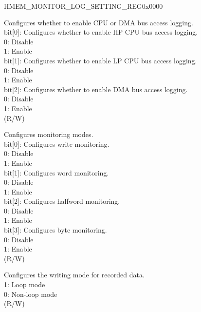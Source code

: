 \begin{register}{H}{MEM\_MONITOR\_LOG\_SETTING\_REG}{0x0000}\label{regdesc:MEMMONITORLOGSETTINGREG}
%
%
%
%
\regnewline%
\begin{regdesc}\begin{reglist}
\label{fielddesc:MEMMONITORLOGENA}\item [MEM\_MONITOR\_LOG\_ENA] Configures whether to enable  CPU or DMA bus access logging.\\
bit[0]: Configures whether to enable HP CPU bus access logging. \\
0: Disable \\
1: Enable\\
bit[1]: Configures whether to enable LP CPU bus access logging. \\
0: Disable\\
1: Enable\\
bit[2]: Configures whether to enable DMA bus access logging. \\
0: Disable\\
1: Enable\\
(R/W)
\label{fielddesc:MEMMONITORLOGMODE}\item [MEM\_MONITOR\_LOG\_MODE]  Configures monitoring modes.\\
bit[0]: Configures write monitoring. \\
0: Disable \\
1: Enable\\
bit[1]: Configures word monitoring. \\
0: Disable \\
1: Enable\\
bit[2]: Configures halfword monitoring. \\
0: Disable \\
1: Enable\\
bit[3]: Configures byte monitoring. \\
0: Disable \\
1: Enable\\
(R/W)
\label{fielddesc:MEMMONITORLOGMEMLOOPENABLE}\item [MEM\_MONITOR\_LOG\_MEM\_LOOP\_ENABLE] Configures the writing mode for recorded data. \\
1: Loop mode\\
0: Non-loop mode\\
(R/W)
\end{reglist}\end{regdesc}
\end{register}


